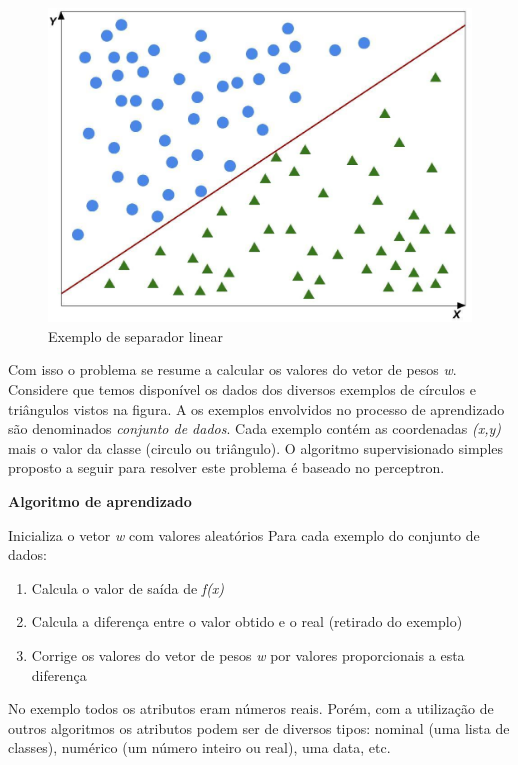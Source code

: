\begin{figure}[h!]
  \includegraphics[width=\linewidth]{images/conceitosbasicos02.eps}
  \caption{Exemplo de separador linear}
  \label{fig:conceitosbasicos02}
\end{figure}

Com isso o problema se resume a calcular os valores do vetor de pesos \textit{w}.
Considere que temos disponível os dados dos diversos exemplos de círculos e triângulos vistos na figura.
A os exemplos envolvidos no processo de aprendizado são denominados \textit{conjunto de dados}.
Cada exemplo contém as coordenadas \textit{(x,y)} mais o valor da classe (circulo ou triângulo).
O algoritmo supervisionado simples proposto a seguir para resolver este problema é baseado no perceptron.
\\

\hline
\begin{center}
\textbf{Algoritmo de aprendizado}
\end{center}
\hline
\hfill \break
Inicializa o vetor \textit{w} com valores aleatórios
Para cada exemplo do conjunto de dados:
\begin{enumerate}
\item Calcula o valor de saída de \textit{f(x)}
\item Calcula a diferença entre o valor obtido e o real (retirado do exemplo) 
\item Corrige os valores do vetor de pesos \textit{w} por valores proporcionais a esta diferença
\end{enumerate}
\hline
\hfill \break

No exemplo todos os atributos eram números reais.
Porém, com a utilização de outros algoritmos os atributos podem ser de diversos tipos: nominal (uma lista de classes), numérico (um número inteiro ou real), uma data, etc.

